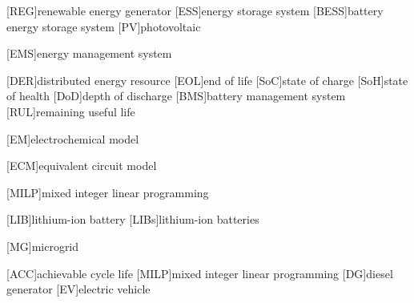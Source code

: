 \begin{acronym}
    [REG]{renewable energy generator}
    [ESS]{energy storage system}
    [BESS]{battery energy storage system}
    [PV]{photovoltaic}
    
    [EMS]{energy management system}
    
    [DER]{distributed energy resource}
    [EOL]{end of life}
    [SoC]{state of charge}
    [SoH]{state of health}
    [DoD]{depth of discharge}
    [BMS]{battery management system}
    [RUL]{remaining useful life}
    
    [EM]{electrochemical model}
    
    [ECM]{equivalent circuit model}
    
    [MILP]{mixed integer linear programming}

    [LIB]{lithium-ion battery}
    [LIBs]{lithium-ion batteries}

    [MG]{microgrid}
    
    [ACC]{achievable cycle life}
    [MILP]{mixed integer linear programming}
    [DG]{diesel generator}
    [EV]{electric vehicle}
\end{acronym}